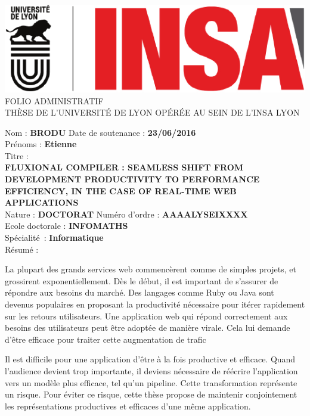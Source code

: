 \begin{center}
  \includegraphics[height=.6in]{../resources/logos}%
  \\[3pt]%
  \fontsize{14pt}{14pt}\selectfont%
  \MakeUppercase{FOLIO ADMINISTRATIF}\\[3pt]%
  \MakeUppercase{Thèse de l'Université de Lyon opérée au sein de l'Insa Lyon}
\end{center}

\begin{framed}
\noindent %
Nom : \textbf{\MakeUppercase{Brodu}} \hfill Date de soutenance : \textbf{23/06/2016}\\[3pt]
Prénoms : \textbf{Etienne}\\[3pt]
Titre :\\
\textbf{\MakeUppercase{Fluxional compiler : seamless shift from development productivity to performance efficiency, in the case of real-time web applications}}
\\

\noindent %
Nature : \textbf{\MakeUppercase{Doctorat}} \hfill Numéro d'ordre :  \textbf{AAAALYSEIXXXX}\\[3pt]
Ecole doctorale : \textbf{INFOMATHS}\\[3pt]
Spécialité : \textbf{Informatique}\\[3pt]
Résumé : \\
{\fontsize{11pt}{12pt}\selectfont%
La plupart des grands services web commencèrent comme de simples projets, et grossirent exponentiellement.
Dès le début, il est important de s'assurer de répondre aux besoins du marché.
Des langages comme Ruby ou Java sont devenus populaires en proposant la productivité  nécessaire pour itérer rapidement sur les retours utilisateurs.
Une application web qui répond correctement aux besoins des utilisateurs peut être adoptée de manière virale.
Cela lui demande d'être efficace pour traiter cette augmentation de trafic

Il est difficile pour une application d'être à la fois productive et efficace.
Quand l'audience devient trop importante, il deviens nécessaire de réécrire l'application vers un modèle plus efficace, tel qu'un pipeline.
Cette transformation représente un risque.
Pour éviter ce risque, cette thèse propose de maintenir conjointement les représentations productives et efficaces d'une même application.

}
\end{framed}
